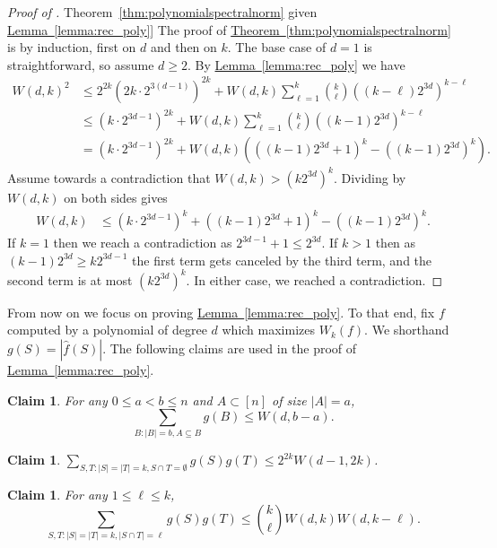 \documentclass[11pt]{article}
\numberwithin{equation}{section}
\newtheorem{claim}[theorem]{Claim}
\theoremstyle{definition}
\theoremstyle{plain}
\newcommand{\expref}[2]{\hyperref[#2]{#1~\ref{#2}}}
\begin{document}
\begin{proof}[Proof of \expref{Theorem}{thm:polynomialspectralnorm} given \expref{Lemma}{lemma:rec_poly}]
The proof of \expref{Theorem}{thm:polynomialspectralnorm} is by induction, first on $d$ and then on $k$. The base case of $d=1$ is straightforward, so assume $d \ge 2$. By \expref{Lemma}{lemma:rec_poly} we have
\begin{align*}
W(d,k)^2 &\le 2^{2k} \left( 2k \cdot 2^{3(d-1)} \right)^{2k}+W(d,k)
\sum_{\ell=1}^k \binom{k}{\ell} \left((k-\ell) 2^{3d} \right)^{k-\ell} \\
& \le
\left( k \cdot 2^{3d-1} \right)^{2k} + W(d,k) \sum_{\ell=1}^k \binom{k}{\ell} \left((k-1) 2^{3d} \right)^{k-\ell} \\
& = \left( k \cdot 2^{3d-1} \right)^{2k} + W(d,k) \left(\left((k-1) 2^{3d}+1\right)^k - \left((k-1) 2^{3d}\right)^k \right).
\end{align*}
Assume towards a contradiction that $W(d,k)>(k 2^{3d})^k$. Dividing by $W(d,k)$ on both sides gives
\begin{align*}
W(d,k) & \le \left( k \cdot 2^{3d-1} \right)^{k} + \left((k-1) 2^{3d}+1\right)^k - \left((k-1) 2^{3d}\right)^k.
\end{align*}
If $k=1$ then we reach a contradiction as $2^{3d-1}+1 \le 2^{3d}$. If $k>1$ then as $(k-1) 2^{3d} \ge k 2^{3d-1}$
the first term gets canceled by the third term, and the second term is
at most $(k 2^{3d})^k$. In either case, we reached a contradiction.
\end{proof}

{}From now on we focus on proving \expref{Lemma}{lemma:rec_poly}.
To that end, fix $f$ computed by a polynomial
of degree $d$ which maximizes $W_k(f)$. We shorthand $g(S) = |\hat{f}(S)|$.
The following claims are used in the proof of \expref{Lemma}{lemma:rec_poly}.
\begin{claim}
\label{claim:fourier_level_down}
For any $0\le a < b \le n$ and $A \subset [n]$ of size $|A| = a$,
$$\sum_{B: |B|=b, A \subseteq B} g(B) \le W(d,b -a).$$
\end{claim}
\begin{claim}
\label{claim:derivative}
$\displaystyle \sum_{S,T: |S|=|T|=k, S \cap T = \emptyset} g(S)g(T) \le 2^{2k} W(d-1,2k)$.
\end{claim}
\begin{claim}
\label{claim:sublevels} For any $1 \le \ell \le k$, $$ \sum_{S,T: |S|=|T|=k, |S \cap T| = \ell} g(S) g(T) \le \binom{k}{\ell} W(d,k)W(d,k-\ell). $$
\end{claim}
\end{document}
